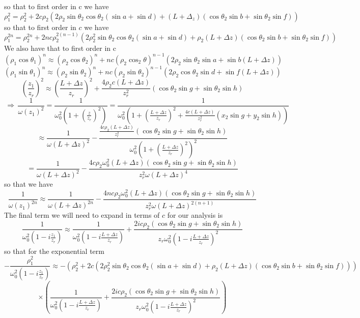 \documentclass[11pt]{amsart}
\makeatletter
\newcommand{\0}{\varnothing}		%
\DeclareMathOperator*{\im}{\, \Longrightarrow \,}	%
\newcommand{\apr}{\approx}		%
\newcommand{\1}{!}
\newcommand{\2}{@}
\newcommand{\3}{\#}
\newcommand{\4}{\$}
\newcommand{\5}{\%}
\newcommand{\6}{$^\wedge$}
\newcommand{\7}{\&}
\newcommand{\8}{*}
\newcommand{\9}{(}
\makeatother
\begin{document}
so that to first order in c we have
\[
\rho_1^2 = \rho_2^2 + 2c\rho_2\left(2\rho_2\sin\theta_2\cos\theta_2\left(\sin a+\sin d\right)+\left(L+\Delta_z\right)\left(\cos\theta_2\sin b+\sin \theta_2\sin f\right)\right)
\]
so that to first order in $c$ we have
\[
\rho_1^{2n} = \rho_2^{2n}+2nc\rho_2^{2(n-1)}\left(2\rho_2^2\sin\theta_2\cos\theta_2\left(\sin a+\sin d\right)+\rho_2\left(L+\Delta z\right)\left(\cos \theta_2\sin b + \sin \theta_2\sin f\right)\right)
\]
We also have that to first order in c
\[
\left(\rho_1\cos\theta_1\right)^{n} \apr \left(\rho_2\cos\theta_2\right)^{n}+nc\left(\rho_2\cos_2 \theta\right)^{n-1}\left(2\rho_2\sin\theta_2\sin a + \sin b \left(L+\Delta z\right)\right)
\]
\[
\left(\rho_1\sin\theta_1\right)^{n} \apr \left(\rho_2\sin\theta_2\right)^{n}+nc\left(\rho_2\sin \theta_2\right)^{n-1}\left(2\rho_2\cos\theta_2\sin d + \sin f \left(L+\Delta z\right)\right)
\]
\[
\left(\frac{z_1}{z_r}\right)^2 \apr \left(\frac{L+\Delta z}{z_r}\right)^2+\frac{4\rho_2c\left(L+\Delta z\right)}{z_r^2}\left(\cos \theta_2\sin g+\sin \theta_2\sin h\right)
\]
\[
\im \frac{1}{\omega(z_1)^2}= \frac{1}{\omega_0^2\left(1+\left(\frac{z}{z_r}\right)^2\right)} = \frac{1}{\omega_0^2\left(1+\left(\frac{L+\Delta z}{z_r}\right)^2+\frac{4c\left(L+\Delta z\right)}{z_r^2}\left(x_2\sin g+y_2\sin h\right)\right)}
\]
\[
\apr \frac{1}{\omega\left(L+\Delta z\right)^2}-\frac{\frac{4c\rho_2\left(L+\Delta z\right)}{z_r^2}\left(\cos \theta_2\sin g+\sin \theta_2\sin h\right)}{\omega_0^2\left(1+\left(\frac{L+\Delta z}{z_r}\right)^2\right)^2}
\]
\[
=\frac{1}{\omega(L+\Delta z)^2}-\frac{4c\rho_2\omega_0^2\left(L+\Delta z\right)\left(\cos \theta_2\sin g+\sin \theta_2\sin h\right)}{z_r^2\omega(L+\Delta z)^4}
\]
so that we have
\[
\frac{1}{\omega(z_1)^{2n}} \apr \frac{1}{\omega(L+\Delta z)^{2n}} -\frac{4nc\rho_2\omega_0^2\left(L+\Delta z\right)\left(\cos \theta_2\sin g+\sin \theta_2\sin h\right)}{z_r^2\omega\left(L+\Delta z\right)^{2(n+1)}}
\]
The final term we will need to expand in terms of $c$ for our analysis is
\[
\frac{1}{\omega_0^2\left(1-i\frac{z_1}{z_r}\right)} \apr \frac{1}{\omega_0^2\left(1-i\frac{L+\Delta z}{z_r}\right)}+\frac{2ic\rho_2\left(\cos \theta_2\sin g+\sin \theta_2\sin h\right)}{z_r\omega_0^2\left(1-i\frac{L+\Delta z}{z_r}\right)^2}
\]
so that for the exponential term
\[
-\frac{\rho_1^2}{\omega_0^2\left(1-i\frac{z_1}{z_r}\right)} \apr -\left(\rho_2^2+2c\left(2\rho_2^2\sin\theta_2\cos\theta_2\left(\sin a+\sin d\right)+\rho_2\left(L+\Delta z\right)\left(\cos\theta_2\sin b + \sin \theta_2\sin f\right)\right)\right)
\]
\[
\times\left(\frac{1}{\omega_0^2\left(1-i\frac{L+\Delta z}{z_r}\right)}+\frac{2ic\rho_2\left(\cos\theta_2\sin g+\sin \theta_2\sin h\right)}{z_r\omega_0^2\left(1-i\frac{L+\Delta z}{z_r}\right)^2}\right)
\]
\end{document}
